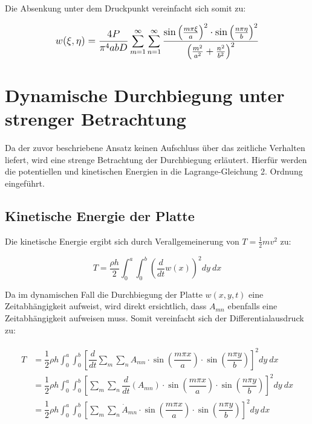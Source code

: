 Die Absenkung unter dem Druckpunkt vereinfacht sich somit zu:

\begin{equation}
 \mathlarger{
	w(\xi,\eta) = \frac{4P}{\pi^4 a b D} 
	\sum_{m = 1}^{\infty} \sum_{n = 1}^{\infty}
	\frac{
		\sin\left(\frac{m \pi \xi}{a}\right)^2 
		\cdot 	\sin\left(\frac{n \pi \eta}{b}\right) ^2
	}{
		\left( 
		\frac{m^2}{a^2} +
		\frac{n^2}{b^2}
		\right)^2
	}
}
\end{equation}



\section{Dynamische Durchbiegung unter strenger Betrachtung}

Da der zuvor beschriebene Ansatz keinen Aufschluss über das zeitliche Verhalten liefert, wird eine strenge Betrachtung der Durchbiegung erläutert. Hierfür werden die potentiellen und kinetischen Energien in die Lagrange-Gleichung 2. Ordnung eingeführt.

\subsection{Kinetische Energie der Platte}

Die kinetische Energie ergibt sich durch Verallgemeinerung von $T = \frac{1}{2} mv^2$ zu:

\begin{equation}
T = \dfrac{\rho h}{2} \int_{0}^{a} \int_{0}^{b} \left(\dfrac{d}{dt} w(x)\right)^2 dy \ dx
\end{equation}

Da im dynamischen Fall die Durchbiegung der Platte $w(x,y,t)$ eine Zeitabhängigkeit aufweist, wird direkt ersichtlich, dass $A_{mn}$ ebenfalls eine Zeitabhängigkeit aufweisen muss. Somit vereinfacht sich der Differentialausdruck zu:


\begin{align}
\begin{split}
T &= \dfrac{1}{2}\rho h \int_0^a \int_0^b  \left[\dfrac{d}{dt} \sum_m \sum_n A_{mn} \cdot \sin\left(\dfrac{m \pi x}{a}\right) \cdot \sin\left(\dfrac{n \pi y}{b}\right) \right]^2 dy \ dx  \\
&= \dfrac{1}{2} \rho h\int_0^a \int_0^b  \left[ \sum_m \sum_n \dfrac{d}{dt}\left(A_{mn}\right) \cdot \sin\left(\dfrac{m \pi x}{a}\right) \cdot \sin\left(\dfrac{n \pi y}{b}\right) \right]^2 dy \ dx \\
&= \dfrac{1}{2} \rho h \int_0^a \int_0^b  \left[ \sum_m \sum_n \dot{A}_{mn} \cdot \sin\left(\dfrac{m \pi x}{a}\right) \cdot \sin\left(\dfrac{n \pi y}{b}\right) \right]^2 dy \ dx \\
\end{split}
\label{eq:T_general}
\end{align}


